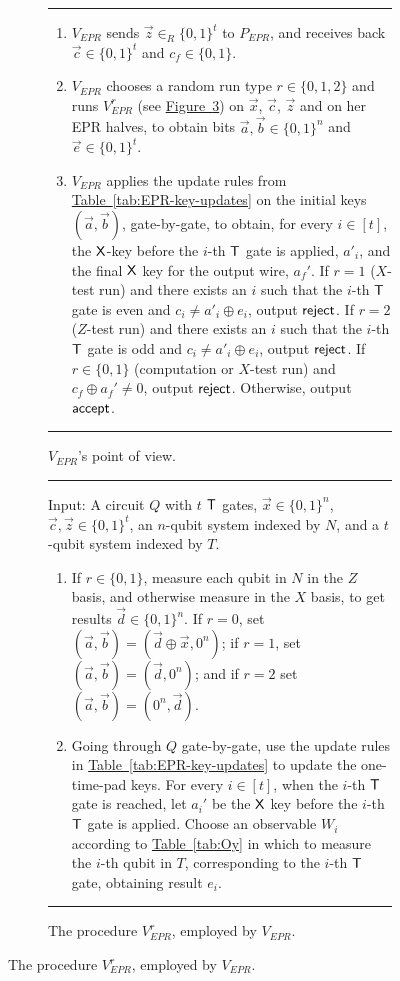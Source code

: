 \documentclass[11pt]{article}
\numberwithin{equation}{section}
\theoremstyle{definition}
\theoremstyle{plain}
\newcommand{\expref}[2]{\hyperref[#2]{#1~\ref{#2}}}
\begin{document}
\begin{figure}[htbp]
  \begin{subfigure}{\textwidth}
\rule[1ex]{\textwidth}{0.5pt}
\begin{enumerate}
\item $V_{EPR}$ sends $\vec{z}\in_R\{0,1\}^t$ to $P_{EPR}$,
and receives back $\vec{c}\in\{0,1\}^t$ and $c_f\in\{0,1\}$.
\item $V_{EPR}$ chooses a random run type $r\in\{0,1,2\}$ and runs $V_{EPR}^r$ (see \expref{Figure}{fig:original-protocol-VEPRr}) on $\vec{x}$, $\vec{c}$, $\vec{z}$ and on her EPR halves, to obtain bits $\vec{a},\vec{b}\in\{0,1\}^n$ and $\vec{e}\in\{0,1\}^t$. 
\item $V_{EPR}$ applies the update rules from \expref{Table}{tab:EPR-key-updates} on the initial keys $(\vec{a},\vec{b})$, gate-by-gate, to obtain, for every $i\in [t]$, the $\sf X$-key before the $i$-th $\sf T$ gate is applied, $a'_i$, and the final $\sf X$ key for the output wire, $a_f'$. If $r=1$ ($X$-test run) and there exists an $i$ such that the $i$-th $\sf T$ gate is even and $c_i\neq a'_i\oplus e_i$, output $\sf reject$. If $r=2$ ($Z$-test run) and there exists an $i$ such that the $i$-th $\sf T$ gate is odd and $c_i\neq a'_i\oplus e_i$, output $\sf reject$. If $r\in\{0,1\}$ (computation or $X$-test run) and $c_f\oplus a_f'\neq 0$, output $\sf reject$. Otherwise, output $\sf accept$. 
\end{enumerate}
\rule[2ex]{\textwidth}{0.5pt} %
    \caption{ $V_{EPR}$'s point of view.}
  \label{fig:original-protocol-VEPR}
    \end{subfigure}

\vspace{0.15cm}      %

\begin{subfigure}{\textwidth}
\rule[1ex]{\textwidth}{0.5pt}
\raggedright
Input: A circuit $Q$ with $t$ $\sf T$ gates, $\vec{x}\in\{0,1\}^n$, $\vec{c},\vec{z}\in\{0,1\}^t$, an $n$-qubit system indexed by $N$, and a $t$-qubit system indexed by $T$.
\begin{enumerate}
\item If $r\in\{0,1\}$, measure each qubit in $N$ in the $Z$ basis, and otherwise measure in the $X$ basis, to get results $\vec{d}\in\{0,1\}^n$. If $r=0$, set $(\vec{a},\vec{b})=(\vec{d}\oplus \vec{x},0^n)$; if $r=1$, set $(\vec{a},\vec{b})=(\vec{d},0^n)$; and if $r=2$ set $(\vec{a},\vec{b})=(0^n,\vec{d})$. 
\item Going through $Q$ gate-by-gate, use the update rules in
\expref{Table}{tab:EPR-key-updates} to update the one-time-pad keys. For every
    $i\in[t]$, when the $i$-th $\sf T$ gate is reached, let $a_i'$ be the $\sf
    X$ key before the $i$-th $\sf T$ gate is applied. Choose an observable $W_i$ according to \expref{Table}{tab:Oy} in which to measure the $i$-th qubit in $T$, corresponding to the $i$-th $\sf T$ gate, obtaining result $e_i$.  
\end{enumerate}
\rule[2ex]{\textwidth}{0.5pt} %
\caption{ The procedure $V_{EPR}^r$, employed by $V_{EPR}$.  }
  \label{fig:original-protocol-VEPRr}
\end{subfigure}


\end{figure}
\end{document}
